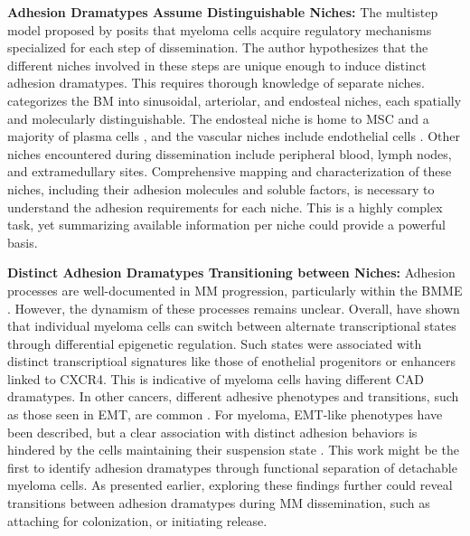 \textbf{Adhesion Dramatypes Assume Distinguishable Niches:} The multistep model
proposed by \citet{zeissigTumourDisseminationMultiple2020} posits that myeloma
cells acquire regulatory mechanisms specialized for each step of dissemination.
The author hypothesizes that the different niches involved in these steps are
unique enough to induce distinct adhesion dramatypes. This requires thorough
knowledge of separate niches. \citet{granataBoneMarrowNiches2022} categorizes
the \ac{BM} into sinusoidal, arteriolar, and endosteal niches, each spatially
and molecularly distinguishable. The endosteal niche is home to \ac{MSC} and a
majority of plasma cells%
%
, and the vascular niches  include endothelial
cells \cite{zehentmeierStaticDynamicComponents2014,
      wilmoreHereThereAnywhere2017}. Other niches encountered during dissemination
include peripheral blood, lymph nodes, and extramedullary sites. Comprehensive
mapping and characterization of these niches, including their adhesion molecules
and soluble factors, is necessary to understand the adhesion requirements for
each niche. This is a highly complex task, yet summarizing available information
per niche could provide a powerful basis.


\textbf{Distinct Adhesion Dramatypes Transitioning between Niches:}
Adhesion processes are well-documented in MM progression, particularly within
the \ac{BMME} \cite{bouzerdanAdhesionMoleculesMultiple2022}. However, the
dynamism of these processes remains unclear. Overall,
\citet{fredeDynamicTranscriptionalReprogramming2021} have shown that individual
myeloma cells can switch between alternate transcriptional states through
differential epigenetic regulation. Such states were associated with distinct
transcriptioal signatures like those of enothelial progenitors or enhancers
linked to CXCR4. This is indicative of myeloma cells having different \ac{CAD}
dramatypes. In other cancers, different adhesive phenotypes and transitions,
such as those seen in \ac{EMT}, are common
\cite{gengDynamicSwitchTwo2014}. For myeloma, EMT-like phenotypes have been
described, but a clear association with distinct adhesion behaviors is hindered
by the cells maintaining their suspension state
\cite{roccaroCXCR4RegulatesExtraMedullary2015,
      qianSETDB1InducesLenalidomide2023}. This work might be the first to identify
adhesion dramatypes through functional separation of detachable myeloma cells.
As presented earlier, exploring these findings further could reveal transitions
between adhesion dramatypes during MM dissemination, such as attaching for
colonization, or initiating release.


